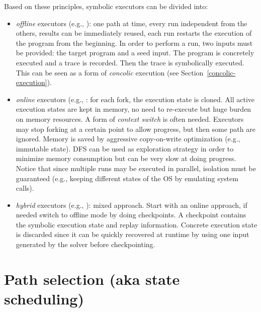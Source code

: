 Based on these principles, symbolic executors can be divided into:
\begin{itemize}
  \item {\em offline} executors (e.g., \cite{SAGE-NDSS08}): one path at time, every run independent from the others, results can be immediately reused, each run restarts the execution of the program from the beginning. In order to perform a run, two inputs must be provided: the target program and a seed input. The program is concretely executed and a trace is recorded. Then the trace is symbolically executed. This can be seen as a form of {\em concolic} execution (see Section~\ref{concolic-execution}).
  \item {\em online} executors (e.g., \cite{KLEE-OSDI08,CKC-TOCS12,AEG-NDSS11}: for each fork, the execution state is cloned. All active execution states are kept in memory, no need to re-execute but huge burden on memory resources. A form of {\em context switch} is often needed. Executors may stop forking at a certain point to allow progress, but then some path are ignored. Memory is saved by aggressive copy-on-write optimization (e.g., immutable state). DFS can be used as exploration strategy in order to minimize memory consumption but can be very slow at doing progress. Notice that since multiple runs may be executed in parallel, isolation must be guaranteed (e.g., keeping different states of the OS by emulating system calls).
  \item {\em hybrid} executors (e.g., \cite{MAYHEM-SP12}): mixed approach. Start with an online approach, if needed switch to offline mode by doing checkpoints. A checkpoint contains the symbolic execution state and replay information. Concrete execution state is discarded since it can be quickly recovered at runtime by using one input generated by the solver before checkpointing.
\end{itemize}

\section{Path selection (aka state scheduling)}
\label{heuristics}

